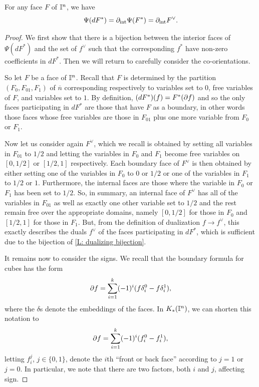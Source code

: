 \begin{lemma}\label{L: dualizing bijection}
For any face $F$ of $\mathbb{I}^n$, we have $$\Psi(d F^*)=\partial_{\text{int}}\Psi(F^*)=\partial_{\text{int}}F^\vee.$$ 
\end{lemma}
\begin{proof}
We first show that there is a bijection between the interior faces of $\Psi(d F^*)$ and the set of $f^\vee$ such that the corresponding $f^*$ have non-zero coefficients in $dF^*$. Then we will return to carefully consider the co-orientations. 

So let $F$ be a face of $\mathbb{I}^n$. Recall that $F$ is determined by the partition $(F_0,F_{01}, F_1)$ of $\overline{n}$ corresponding respectively to variables set to $0$, free variables of $F$, and variables set to $1$. By definition, $(dF^*)(f)=F^*(\partial f)$ and so the only faces participating in $dF^*$ are those that have $F$ as a boundary, in other words those faces whose free variables are those in $F_{01}$ plus one more variable from $F_0$ or $F_1$. 

Now let us consider again $F^\vee$, which we recall is obtained by setting all variables in $F_{01}$ to $1/2$ and letting the variables in $F_0$ and $F_1$ become free variables on $[0,1/2]$ or $[1/2,1]$ respectively. Each boundary face of $F^\vee$ is then obtained by either setting one of the variables in $F_0$ to $0$ or $1/2$ or one of the variables in $F_1$ to $1/2$ or $1$. Furthermore, the internal faces are those where the variable in $F_0$ or $F_1$ has been set to $1/2$. So, in summary, an internal face of $F^\vee$ has all of the variables in $F_{01}$ as well as exactly one other variable set to $1/2$ and the rest remain free over the appropriate domains, namely $[0,1/2]$ for those in $F_0$ and $[1/2,1]$ for those in $F_1$. But, from the definition of dualization $f\to f^\vee$, this exactly describes the duals $f^\vee$ of the faces participating in $dF^*$, which is sufficient due to the bijection of \cref{L: dualizing bijection}.

It remains now to consider the signs. We recall that the boundary formula for cubes has the form
$$\partial f=\sum_{i=1}^k (-1)^i(f \delta_i^0-f \delta^1_i),$$  where the $\delta$s denote the embeddings of the faces. In $K_*(\mathbb{I}^n)$, we can shorten this notation to $$\partial f=\sum_{i=1}^k (-1)^i(f_i^0-f^1_i),$$ letting $f_i^j$, $j\in \{0,1\}$, denote the $i$th ``front or back face'' according to $j=1$ or $j=0$. In particular, we note that there are two factors, both $i$ and $j$, affecting sign. 


\end{proof}
